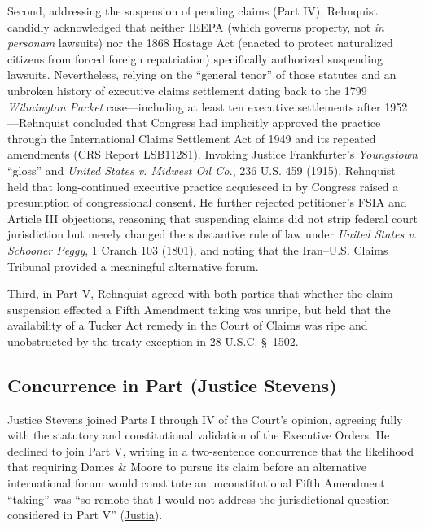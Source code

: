 \documentclass[12pt]{article}
\begin{document}
Second, addressing the suspension of pending claims (Part IV), Rehnquist candidly acknowledged that neither IEEPA (which governs property, not \textit{in personam} lawsuits) nor the 1868 Hostage Act (enacted to protect naturalized citizens from forced foreign repatriation) specifically authorized suspending lawsuits. Nevertheless, relying on the ``general tenor'' of those statutes and an unbroken history of executive claims settlement dating back to the 1799 \textit{Wilmington Packet} case---including at least ten executive settlements after 1952---Rehnquist concluded that Congress had implicitly approved the practice through the International Claims Settlement Act of 1949 and its repeated amendments (\href{https://www.everycrsreport.com/reports/LSB11281.html}{CRS Report LSB11281}). Invoking Justice Frankfurter's \textit{Youngstown} ``gloss'' and \textit{United States v. Midwest Oil Co.}, 236 U.S. 459 (1915), Rehnquist held that long-continued executive practice acquiesced in by Congress raised a presumption of congressional consent. He further rejected petitioner's FSIA and Article III objections, reasoning that suspending claims did not strip federal court jurisdiction but merely changed the substantive rule of law under \textit{United States v. Schooner Peggy}, 1 Cranch 103 (1801), and noting that the Iran--U.S. Claims Tribunal provided a meaningful alternative forum.

Third, in Part V, Rehnquist agreed with both parties that whether the claim suspension effected a Fifth Amendment taking was unripe, but held that the availability of a Tucker Act remedy in the Court of Claims was ripe and unobstructed by the treaty exception in 28 U.S.C. \S\ 1502.

\subsection{Concurrence in Part (Justice Stevens)}
Justice Stevens joined Parts I through IV of the Court's opinion, agreeing fully with the statutory and constitutional validation of the Executive Orders. He declined to join Part V, writing in a two-sentence concurrence that the likelihood that requiring Dames \& Moore to pursue its claim before an alternative international forum would constitute an unconstitutional Fifth Amendment ``taking'' was ``so remote that I would not address the jurisdictional question considered in Part V'' (\href{https://supreme.justia.com/cases/federal/us/453/654/}{Justia}).
\end{document}
